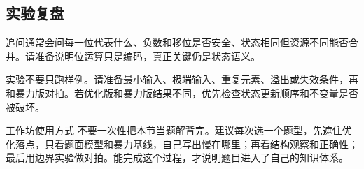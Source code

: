 \subsection{实验复盘}

追问通常会问每一位代表什么、负数和移位是否安全、状态相同但资源不同能否合并。请准备说明位运算只是编码，真正关键仍是状态语义。

实验不要只跑样例。请准备最小输入、极端输入、重复元素、溢出或失效条件，再和暴力版对拍。若优化版和暴力版结果不同，优先检查状态更新顺序和不变量是否被破坏。

\begin{principlebox}{工作坊使用方式}
不要一次性把本节当题解背完。建议每次选一个题型，先遮住优化落点，只看题面模型和暴力基线，自己写出慢在哪里；再看结构观察和正确性；最后用边界实验做对拍。能完成这个过程，才说明题目进入了自己的知识体系。
\end{principlebox}

